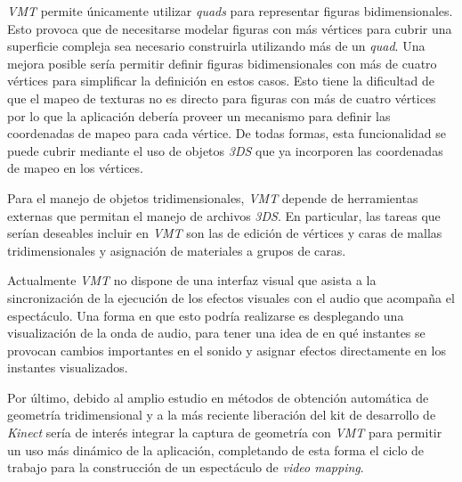 \emph{VMT} permite únicamente utilizar \emph{quads} para representar figuras bidimensionales. Esto provoca que de necesitarse modelar figuras con más vértices para cubrir una superficie compleja sea necesario construirla utilizando más de un \emph{quad}. Una mejora posible sería permitir definir figuras bidimensionales con más de cuatro vértices para simplificar la definición en estos casos. Esto tiene la dificultad de que el mapeo de texturas no es directo para figuras con más de cuatro vértices por lo que la aplicación debería proveer un mecanismo para definir las coordenadas de mapeo para cada vértice. De todas formas, esta funcionalidad se puede cubrir mediante el uso de objetos \emph{3DS} que ya incorporen las coordenadas de mapeo en los vértices.

Para el manejo de objetos tridimensionales, \emph{VMT} depende de herramientas externas que permitan el manejo de archivos \emph{3DS}. En particular, las tareas que serían deseables incluir en \emph{VMT} son las de edición de vértices y caras de mallas tridimensionales y asignación de materiales a grupos de caras.

Actualmente \emph{VMT} no dispone de una interfaz visual que asista a la sincronización de la ejecución de los efectos visuales con el audio que acompaña el espectáculo.
Una forma en que esto podría realizarse es desplegando una visualización de la onda de audio, para tener una idea de en qué instantes se provocan cambios importantes en el sonido y asignar efectos directamente en los instantes visualizados.

Por último, debido al amplio estudio en métodos de obtención automática de geometría tridimensional y a la más reciente liberación del kit de desarrollo de \emph{Kinect} sería de interés integrar la captura de geometría con \emph{VMT} para permitir un uso más dinámico de la aplicación, completando de esta forma el ciclo de trabajo para la construcción de un espectáculo de \emph{video mapping}.
